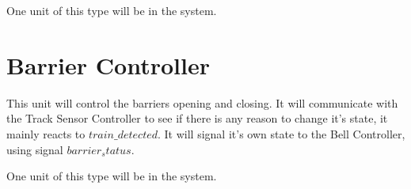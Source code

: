\documentclass[final]{report}
\begin{document}
One unit of this type will be in the system.

\section{Barrier Controller}
This unit will control the barriers opening and closing.
It will communicate with the Track Sensor Controller to see if there is any reason to change it's state, it mainly reacts to $train\_detected$.
It will signal it's own state to the Bell Controller, using signal $barrier_status$.

One unit of this type will be in the system.
\end{document}
